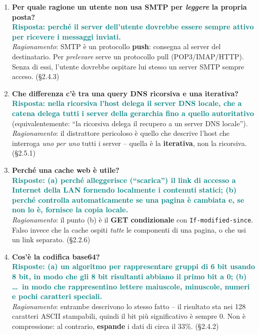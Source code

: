 \documentclass[12pt, a4paper]{article}
\begin{document}
\begin{enumerate}[leftmargin=*, resume]

\item \textbf{Per quale ragione un utente non usa SMTP per \emph{leggere} la propria posta?}\\
\textcolor{teal}{\textbf{Risposta: perché il server dell'utente dovrebbe essere sempre attivo per ricevere i messaggi inviati.}}\\
\textit{Ragionamento}: SMTP è un protocollo \textbf{push}: consegna al server del destinatario. Per \emph{prelevare} serve un protocollo pull (POP3/IMAP/HTTP). Senza di essi, l'utente dovrebbe ospitare lui stesso un server SMTP sempre acceso. (\S2.4.3)

\item \textbf{Che differenza c'è tra una query DNS ricorsiva e una iterativa?}\\
\textcolor{teal}{\textbf{Risposta: nella ricorsiva l'host delega il server DNS locale, che a catena delega tutti i server della gerarchia fino a quello autoritativo}} (equivalentemente: ``la ricorsiva delega il recupero a un server DNS locale'').\\
\textit{Ragionamento}: il distrattore pericoloso è quello che descrive l'host che interroga \emph{uno per uno} tutti i server -- quella è la \textbf{iterativa}, non la ricorsiva. (\S2.5.1)

\item \textbf{Perché una cache web è utile?}\\
\textcolor{teal}{\textbf{Risposte: (a) perché alleggerisce (``scarica'') il link di accesso a Internet della LAN fornendo localmente i contenuti statici; (b) perché controlla automaticamente se una pagina è cambiata e, se non lo è, fornisce la copia locale.}}\\
\textit{Ragionamento}: il punto (b) è il \textbf{GET condizionale} con \texttt{If-modified-since}. Falso invece che la cache ospiti \emph{tutte} le componenti di una pagina, o che usi un link separato. (\S2.2.6)

\item \textbf{Cos'è la codifica base64?}\\
\textcolor{teal}{\textbf{Risposte: (a) un algoritmo per rappresentare gruppi di 6 bit usando 8 bit, in modo che gli 8 bit risultanti abbiano il primo bit a 0; (b) \dots\ in modo che rappresentino lettere maiuscole, minuscole, numeri e pochi caratteri speciali.}}\\
\textit{Ragionamento}: entrambe descrivono lo stesso fatto -- il risultato sta nei 128 caratteri ASCII stampabili, quindi il bit più significativo è sempre 0. \textcolor{red!70!black}{Non} è compressione: al contrario, \textbf{espande} i dati di circa il 33\%. (\S2.4.2)


\end{enumerate}
\end{document}
